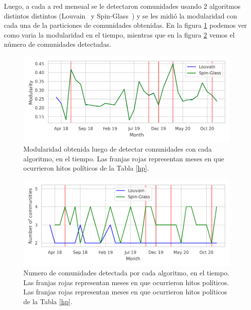 \documentclass{proyectotesis}
\begin{document}
Luego, a cada a red mensual se le detectaron comunidades usando 2 algoritmos distintos distintos (Louvain~\cite{blondel_fast_2008} y Spin-Glass~\cite{reichardt_statistical_2006}) y se les midió la modularidad con cada una de la particiones de comunidades obtenidas. En la figura \ref{modfig} podemos ver como varia la modularidad en el tiempo, mientras que en la figura \ref{N} vemos el número de comunidades detectadas.\\
\begin{figure}[h!]
    \centering
    \includegraphics[width=0.85\linewidth]{mod.pdf} 
    \vspace{-5mm}
    \caption{Modularidad obtenida luego de detectar comunidades con cada algoritmo, en el tiempo. Las franjas rojas representan meses en que ocurrieron hitos políticos de la Tabla \ref{hp}.}
    \label{modfig}
\end{figure}
\begin{figure}[h!]
    \centering
    \includegraphics[width=0.85\linewidth]{N.pdf} 
    \vspace{-5mm}
    \caption{Numero de comunidades detectada por cada algoritmo, en el tiempo. Las franjas rojas representan meses en que ocurrieron hitos políticos. Las franjas rojas representan meses en que ocurrieron hitos políticos de la Tabla \ref{hp}.}
    \label{N}
\end{figure}

\renewcommand{\tablename}{Tabla}
\end{document}
